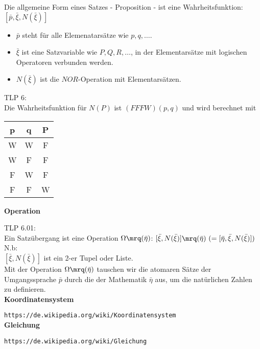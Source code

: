 \documentclass[10pt,a4paper]{article}
\begin{document}
Die allgemeine Form eines Satzes - Proposition - ist eine Wahrheitsfunktion:
$[\bar p, \bar \xi, N(\bar \xi)]$

\begin{itemize}
  \setlength\itemsep{0em}
  
\item $\bar p$        steht für alle Elemenatarsätze wie $p, q, \ldots$.
\item $\bar \xi$      ist eine Satzvariable wie $P, Q, R, \ldots$, in der
  Elementarsätze mit logischen Operatoren verbunden werden.
\item $N (\bar \xi)$  ist die $NOR$-Operation mit Elementarsätzen.
\end{itemize}
 
TLP 6: \\
Die Wahrheitsfunktion für $N(P)$ ist $(FFFW) (p,q)$ und wird berechnet mit \\

\begin{tabular}{|c|c|c|}
  \hline
  \rowcolor{eggshell} \textbf{p} & \textbf{q} & \textbf{P} \\
  \hline
  W & W & F \\
  W & F & F \\
  F & W & F \\
  F & F & W \\
  \hline
\end{tabular}


\vskip 8pt
{\bf Operation}
\vskip 8pt

TLP 6.01: \\
Ein Satzübergang ist eine Operation $\Omega\mrq(\bar \eta)$:
$[\bar \xi, N(\bar \xi)]\mrq (\bar\eta)\ (= [\bar \eta, \bar \xi, N(\bar \xi)])$ \\

N.b: \\
$[\bar \xi, N(\bar \xi)]$ ist ein 2-er Tupel oder Liste. \\
Mit der Operation $\Omega\mrq(\bar \eta)$ tauschen wir die atomaren Sätze der
Umgangssprache $\bar p$ durch die der Mathematik $\bar \eta$ aus, um die
natürlichen Zahlen zu definieren. \\

{\bf Koordinatensystem}
\vskip 8pt

\verb+https://de.wikipedia.org/wiki/Koordinatensystem+ \\

{\bf Gleichung}
\vskip 8pt

\verb+https://de.wikipedia.org/wiki/Gleichung+ \\
\end{document}
